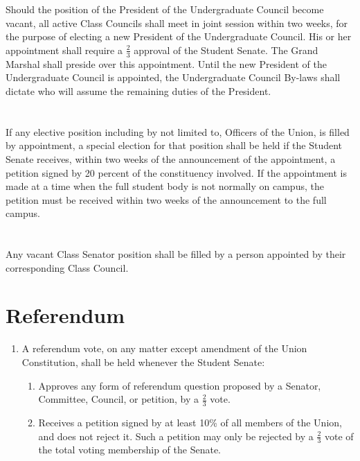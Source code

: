 \documentclass[12pt]{constitution}
\begin{document}
\section{}
Should the position of the President of the Undergraduate Council become vacant, all active Class
Councils shall meet in joint session within two weeks, for the purpose of electing a new President of the
Undergraduate Council. His or her appointment shall require a $\frac{2}{3}$ approval of the Student Senate. The
Grand Marshal shall preside over this appointment. Until the new President of the Undergraduate
Council is appointed, the Undergraduate Council By-laws shall dictate who will assume the remaining
duties of the President.

\section{}
If any elective position including by not limited to, Officers of the Union, is filled by appointment, a
special election for that position shall be held if the Student Senate receives, within two weeks of the
announcement of the appointment, a petition signed by 20 percent of the constituency involved. If the
appointment is made at a time when the full student body is not normally on campus, the petition must
be received within two weeks of the announcement to the full campus.

\section{}
Any vacant Class Senator position shall be filled by a person appointed by their corresponding Class
Council.

\section{Referendum}
\begin{enumerate}
\item A referendum vote, on any matter except amendment of the Union Constitution, shall be held
whenever the Student Senate:
\begin{enumerate}
\item Approves any form of referendum question proposed by a Senator, Committee, Council,
or petition, by a $\frac{2}{3}$ vote.
\item Receives a petition signed by at least 10\% of all members of the Union, and does not
reject it. Such a petition may only be rejected by a $\frac{2}{3}$ vote of the total voting
membership of the Senate.
\end{enumerate}
\end{enumerate}
\end{document}
